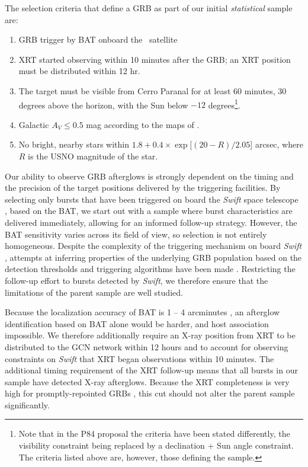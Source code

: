 \documentclass[longauth]{aa}    %
\begin{document}
The selection criteria that define a GRB as part of our initial \textit{statistical}
	sample are:

\begin{enumerate}
	
	\item GRB trigger by BAT onboard the \swift~satellite

	\item XRT started observing within 10 minutes after the GRB; an XRT position
	must be distributed within 12 hr.
	
	\item The target must be visible from Cerro Paranal for at least 60 minutes, 30
degrees above the horizon, with the Sun below $-12$ degrees\footnote{Note that
	in the P84 proposal the criteria have been stated differently, the visibility
	constraint being replaced by a declination + Sun angle constraint. The criteria
	listed above are, however, those defining the sample.}.

	\item Galactic $A_V \leq 0.5$ mag according to the maps of \citet{Schlegel1998}.
	
	\item No bright, nearby stars within $ 1.8 + 0.4 \times \exp[(20 - R)/2.05$]
arcsec, where $R$ is the USNO magnitude of the star.
	
\end{enumerate}

Our ability to observe GRB afterglows is strongly dependent on the timing and
the precision of the target positions delivered by the triggering facilities. By
selecting only bursts that have been triggered on board the \textit{Swift} space
telescope \citep{Gehrels2004}, based on the BAT, we start out with a sample
where burst characteristics are delivered immediately, allowing for an informed
follow-up strategy. However, the BAT sensitivity varies across its field of
view, so selection is not entirely homogeneous. Despite the complexity of the
triggering mechanism on board \textit{Swift} \citep{Band2006, Coward2013a},
attempts at inferring properties of the underlying GRB population based on the
detection thresholds and triggering algorithms have been made \citep{Lien2014,
	Graff2016}. Restricting the follow-up effort to bursts detected by
\textit{Swift}, we therefore ensure that the limitations of the parent sample
are well studied.

Because the localization accuracy of BAT is 1 -- 4 arcminutes
\citep{Barthelmy2005}, an afterglow identification based on BAT alone would be
harder, and  host association impossible. We therefore additionally require an
X-ray position from XRT to be distributed to the GCN network
\citep{Barthelmy2000} within 12 hours and to account for observing constraints
on \textit{Swift} that XRT began observations within 10 minutes. The additional
timing requirement of the XRT follow-up means that all bursts in our sample have
detected X-ray afterglows. Because the XRT completeness is very high for
promptly-repointed GRBs \citep{Burrows2007}, this cut should not alter the
parent sample significantly.
\end{document}
